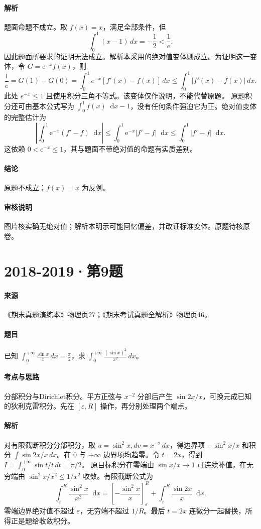 \documentclass[UTF8,fontset=fandol,12pt,oneside,openany]{ctexrep}
\newcommand{\dd}{\mathop{}\!\mathrm d}
\newcommand{\ee}{\mathrm e}
\theoremstyle{definition}
\begin{document}
\paragraph{解析}
题面命题不成立。取 $f(x)=x$，满足全部条件，但
\[\int_0^1(x-1)\,dx=-\frac12<\frac1e.\]
因此题面所要求的证明无法成立。解析本采用的绝对值变体则成立。为证明这一变体，令 $G=\ee^{-x}f(x)$，则
\[\frac1e=G(1)-G(0)=\int_0^1e^{-x}[f'(x)-f(x)]\,dx\le\int_0^1|f'(x)-f(x)|\,dx.\]
此处 $e^{-x}\le1$ 且使用积分三角不等式。该变体仅作说明，不能代替原题。
原题积分还可由基本公式写为 $\int_0^1f(x)\dd x-1$，没有任何条件强迫它为正。绝对值变体的完整估计为
\[
\left|\int_0^1\ee^{-x}(f'-f)\dd x\right|
\le\int_0^1\ee^{-x}|f'-f|\dd x
\le\int_0^1|f'-f|\dd x.
\]
这依赖 $0<\ee^{-x}\le1$，其与题面不带绝对值的命题有实质差别。
\paragraph{结论}
原题不成立；$f(x)=x$ 为反例。
\paragraph{审核说明}
图片核实确无绝对值；解析本明示可能回忆偏差，并改证标准变体。原题待核原卷。

\par\addvspace{18pt}\noindent\begin{minipage}{\linewidth}
\section{2018-2019·第9题}
\label{exam:11:q20}
\paragraph{来源} 《期末真题演练本》物理页27；《期末考试真题全解析》物理页46。
\paragraph{题目}
已知 $\int_0^{+\infty}\frac{\sin x}x\,dx=\frac\pi2$，求 $\int_0^{+\infty}\frac{(\sin x)^2}{x^2}\,dx$。
\end{minipage}\par
\paragraph{考点与思路}
分部积分与Dirichlet积分。平方正弦与 $x^{-2}$ 分部后产生 $\sin2x/x$，可换元成已知的狄利克雷积分。先在 $[\varepsilon,R]$ 操作，再分别处理两个端点。
\paragraph{解析}
对有限截断积分分部积分，取 $u=\sin^2x,dv=x^{-2}\,dx$，得边界项 $-\sin^2x/x$ 和积分 $\int\sin2x/x\,dx$。在 $0$ 与 $+\infty$ 边界项均趋零。令 $t=2x$，得到 $I=\int_0^{+\infty}\sin t/t\,dt=\pi/2$。
原目标积分在零端由 $\sin x/x\to1$ 可连续补值，在无穷端由 $\sin^2x/x^2\le1/x^2$ 收敛。有限截断公式为
\[
\int_\varepsilon^R\frac{\sin^2x}{x^2}\dd x
=\left[-\frac{\sin^2x}{x}\right]_\varepsilon^R+\int_\varepsilon^R\frac{\sin2x}{x}\dd x.
\]
零端边界绝对值不超过 $\varepsilon$，无穷端不超过 $1/R$。最后 $t=2x$ 连微分一起替换，所得正是题给收敛积分。
\end{document}
